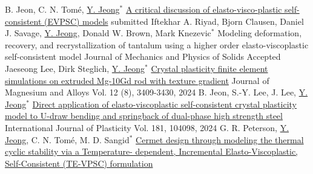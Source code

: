 
\begin{cventries}
  \cventry
  {B. Jeon, C. N. Tom\'{e}, \underline{Y. Jeong}$^*$}
  {\href{https://dx.doi.org/10.2139/ssrn.4969819)}{A critical discussion of elasto-visco-plastic self-consistent (EVPSC) models}}
  {submitted}
  {}
  {
  }
  \cventry
  {Iftekhar A. Riyad, Bjorn Clausen, Daniel J. Savage, \underline{Y. Jeong}, Donald W. Brown, Mark Knezevic$^*$}
  {Modeling deformation, recovery, and recrystallization of tantalum using a higher order elasto-viscoplastic self-consistent model}
  {Journal of Mechanics and Physics of Solids}
  {Accepted}
  {
  }
  \cventry
  {Jaeseong Lee, Dirk Steglich, \underline{Y. Jeong}$^*$}
  {\href{https://doi.org/10.1016/j.jma.2024.08.009}{Crystal plasticity finite element simulations on extruded Mg-10Gd rod with texture gradient}}
  {Journal of Magnesium and Alloys}
  {Vol. 12 (8), 3409-3430, 2024}
  {
  }
  \cventry
  {B. Jeon, S.-Y. Lee, J. Lee, \underline{Y. Jeong}$^*$}
  {\href{https://doi.org/10.1016/j.ijplas.2024.104098}{Direct application of elasto-viscoplastic self-consistent crystal plasticity model to U-draw bending and springback of dual-phase high strength steel}}
  {International Journal of Plasticity}
  {Vol. 181, 104098, 2024}
  {
  }
  \cventry
  {G. R. Peterson, \underline{Y. Jeong}, C. N. Tom\'{e}, M. D. Sangid$^*$}
  {\href{https://doi.org/10.1016/j.ijplas.2024.104032}{Cermet design through modeling the thermal cyclic stability via a Temperature- dependent, Incremental Elasto-Viscoplastic, Self-Consistent (TE-VPSC) formulation}}

\end{cventries}
